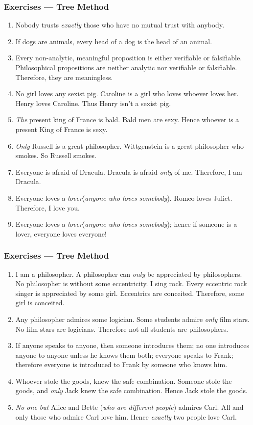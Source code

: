 \documentclass[UTF8,11pt,colorlinks,compress,openany]{beamer}%
\begin{document}
\begin{frame}\frametitle{Exercises --- Tree Method}%
		\begin{enumerate}
			\item Nobody trusts \emph{exactly} those who have no mutual trust with anybody.
			\item If dogs are animals, every head of a dog is the head of an animal.
			\item Every non-analytic, meaningful proposition is either verifiable or falsifiable. Philosophical propositions are neither analytic nor verifiable or falsifiable. Therefore, they are meaningless.
			\item No girl loves any sexist pig. Caroline is a girl who loves whoever loves her. Henry loves Caroline. Thus Henry isn't a sexist pig.
			\item \emph{The} present king of France is bald. Bald men are sexy. Hence whoever is a present King of France is sexy.
			\item \emph{Only} Russell is a great philosopher. Wittgenstein is a great philosopher who smokes. So Russell smokes.
			\item Everyone is afraid of Dracula. Dracula is afraid \emph{only} of me. Therefore, I am Dracula.
			\item Everyone loves a \emph{lover}(\emph{anyone who loves somebody}). Romeo loves Juliet. Therefore, I love you.
			\item Everyone loves a \emph{lover}(\emph{anyone who loves somebody}); hence if someone is a lover, everyone loves everyone!
		\end{enumerate}
\end{frame}

\begin{frame}\frametitle{Exercises --- Tree Method}
		\begin{enumerate}
			\item I am a philosopher. A philosopher can \emph{only} be appreciated by philosophers. No philosopher is without some eccentricity. I sing rock. Every eccentric rock singer is appreciated by some girl. Eccentrics are conceited. Therefore, some girl is conceited.
			\item Any philosopher admires some logician. Some students admire \emph{only} film stars. No film stars are logicians. Therefore not all students are philosophers.
			\item If anyone speaks to anyone, then someone introduces them; no one introduces anyone to anyone unless he knows them both; everyone speaks to Frank; therefore everyone is introduced to Frank by someone who knows him.
			\item Whoever stole the goods, knew the safe combination. Someone stole the goods, and \emph{only} Jack knew the safe combination. Hence Jack stole the goods.
			\item \emph{No one but} Alice and Bette (\emph{who are different people}) admires Carl. All and only those who admire Carl love him. Hence \emph{exactly} two people love Carl.
		\end{enumerate}
\end{frame}
\end{document}
